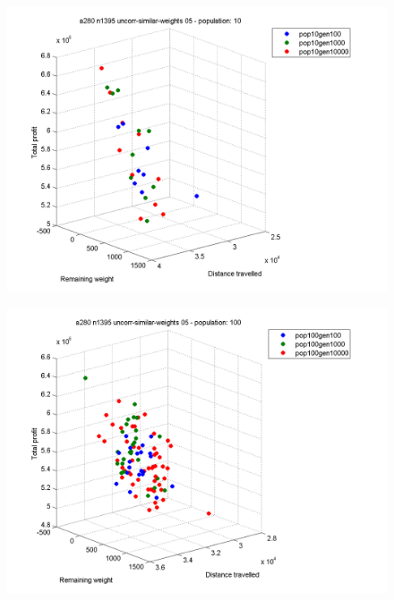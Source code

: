 \documentclass[a4paper,12pt]{article}
\begin{document}
\begin{figure}[h]
\centering
\begin{minipage}{.5\textwidth}
  \centering
  \includegraphics[width=.8\linewidth]{q4graphs/a280_n1395_pop10.png}
  \label{fig:a280139510}
\end{minipage}%
\begin{minipage}{.5\textwidth}
  \centering
  \includegraphics[width=.8\linewidth]{q4graphs/a280_n1395_pop100.png}
  \label{fig:a2801395100}
\end{minipage}
\end{figure}
\end{document}
